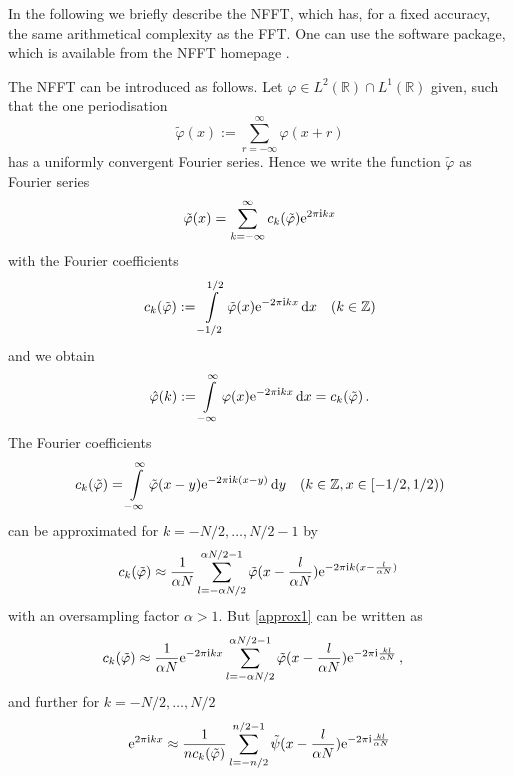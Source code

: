 \documentclass[journal]{IEEEtran}
\def\ti{\mbox{\scriptsize{\rm i}}}
\newcommand{\eip}[1]{{\rm e}^{ 2\pi{\ti} #1}}
\newcommand{\eim}[1]{{\rm e}^{-2\pi{\ti} #1}}
\renewcommand{\d}{{\rm d}}
\numberwithin{equation}{section}
\numberwithin{table}{section}
\numberwithin{figure}{section}
\begin{document}
In the following we briefly describe the NFFT, which has, for a fixed accuracy,
the same arithmetical complexity as the FFT. One can use the
software package, which is available from the NFFT homepage \cite{kupo02C}.

The NFFT can be introduced as follows. 
Let $\varphi\in L^2(\mathbb{R})\cap L^1(\mathbb{R}) $ given, such that
the one periodisation
\begin{equation} \label{phiper}
\tilde\varphi(x) :=  \sum_{r=-\infty}^{\infty} \varphi(x+r)
\end{equation} 
has a uniformly convergent Fourier series.
Hence we write the function $\tilde\varphi$ as Fourier series 
\begin{equation} \label{FRphi}
\tilde\varphi (x) =  \sum_{ k=-\infty }^{\infty}  c_{k}(\tilde\varphi)  
\eip{ k x} 
\end{equation} 
with the Fourier coefficients 
\begin{equation} \label{FKphi}
c_{ k} (\tilde \varphi ) :=  
\int\limits_{-1/2}^{1/2} \tilde\varphi ( x)
  \eim{ kx} \, {\rm d} {x} \quad ( k \in \mathbb{Z}) 
\end{equation}
and we obtain 
\begin{equation}\label{FK=ck}
\hat\varphi(k) := \int\limits_{-\infty}^{\infty} \varphi ( x)
  \eim{ k x} \, \d { x} = c_{ k} (\tilde \varphi )\, .
\end{equation}
The Fourier coefficients
\begin{equation*}
c_{ k} (\tilde \varphi ) =  
\int\limits_{-\infty}^{\infty} \tilde\varphi (x-y)
  \eim{ k(x-y)} \, {\rm d} {y} \quad ( k \in \mathbb{Z}, x\in[-1/2,1/2)) 
\end{equation*}
can be approximated for $k=-N/2,\ldots, N/2-1$ by
\begin{equation} \label{approx1}
c_{ k} (\tilde \varphi ) \approx
\frac{1}{\alpha N} \sum_{l=-\alpha N/2}^{\alpha N/2-1}
\tilde\varphi (x-\frac{l}{\alpha N})  \eim{ k(x-\frac{l}{\alpha N})} \,
\end{equation}
with an oversampling factor $\alpha >1$.
But \eqref{approx1} can be written as
\[
c_{ k} (\tilde \varphi ) \approx
\frac{1}{\alpha N}\eim{kx}
\sum_{l=-\alpha N/2}^{\alpha N/2-1}
\tilde\varphi (x-\frac{l}{\alpha N})  \eim{\frac{kl}{\alpha N}} \,,\quad
\]
and further for $k=-N/2,\ldots,N/2$
\begin{equation} \label{approx}
\eip{kx}
\approx
\frac{1}{nc_{ k} (\tilde \varphi )}
\sum_{l=-n/2}^{n/2-1}
\tilde\psi (x-\frac{l}{\alpha N})  \eim{\frac{kl}{\alpha N}}
\end{equation}
\end{document}
